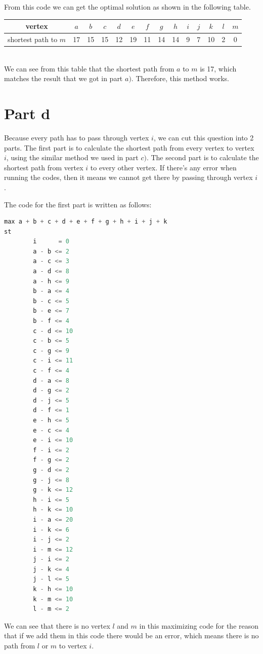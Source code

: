 \documentclass[11pt]{scrreprt}
\begin{document}
From this code we can get the optimal solution as shown in the following table.\\
\begin{tabular}{|c|c|c|c|c|c|c|c|c|c|c|c|c|c|}
	\hline vertex & $a$   &  $b$ & $c$ & $d$ & $e$ & $f$ & $g$ & $h$ & $i$  & $j$ & $k$ & $l$ & $m$   \\
	\hline shortest path to $m$ & 17 & 15 & 15 & 12 & 19 & 11 & 14 & 14 & 9 & 7 & 10 & 2 & 0 \\
	\hline
\end{tabular} \\

We can see from this table that the shortest path from $a$ to $m$ is 17, which matches the result that we got in part $a)$. Therefore, this method works.

\section{Part d}

Because every path has to pass through vertex $i$, we can cut this question into 2 parts. The first part is to calculate the shortest path from every vertex to vertex $i$, using the similar method we used in part $c)$. The second part is to calculate the shortest path from vertex $i$ to every other vertex. If there's any error when running the codes, then it means we cannot get there by passing through vertex $i$. 

The code for the first part is written as follows:
\begin{lstlisting}[language=c]
max a + b + c + d + e + f + g + h + i + j + k
st
        i      = 0 
        a - b <= 2
        a - c <= 3
        a - d <= 8
        a - h <= 9
        b - a <= 4
        b - c <= 5
        b - e <= 7
        b - f <= 4
        c - d <= 10
        c - b <= 5
        c - g <= 9
        c - i <= 11
        c - f <= 4
        d - a <= 8
        d - g <= 2
        d - j <= 5
        d - f <= 1
        e - h <= 5
        e - c <= 4
        e - i <= 10
        f - i <= 2
        f - g <= 2
        g - d <= 2
        g - j <= 8
        g - k <= 12
        h - i <= 5
        h - k <= 10
        i - a <= 20
        i - k <= 6
        i - j <= 2
        i - m <= 12
        j - i <= 2
        j - k <= 4
        j - l <= 5
        k - h <= 10
        k - m <= 10
        l - m <= 2
\end{lstlisting}

We can see that there is no vertex $l$ and $m$ in this maximizing code for the reason that if we add them in this code there would be an error, which means there is no path from $l$ or $m$ to vertex $i$.
\end{document}
